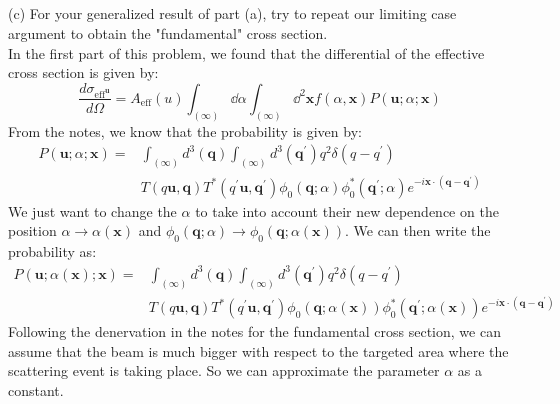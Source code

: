 \documentclass[12pt]{article}
\begin{document}
\subsection{}
(c) For your generalized result of part (a), try to repeat our limiting case argument to obtain the "fundamental" cross section.\\
In the first part of this problem, we found that the differential of the effective cross section is given by:
\begin{equation}
\frac{d\sigma_{\text{eff}^{\textbf{u}}}}{d\Omega} = A_{\text{eff}}(u) \int_{(\infty)} \dd{\alpha} \int_{(\infty)} \dd^2{\textbf{x}} f(\alpha, \textbf{x}) P(\textbf{u} ; \alpha ; \mathbf{x})
\end{equation}
From the notes, we know that the probability is given by:
\begin{equation}
\begin{aligned}
P(\mathbf{u} ; \alpha ; \mathbf{x})= & \int_{(\infty)} d^3(\mathbf{q}) \int_{(\infty)} d^3\left(\mathbf{q}^{\prime}\right) q^2 \delta\left(q-q^{\prime}\right) \\
& T(q \mathbf{u}, \mathbf{q}) T^*\left(q^{\prime} \mathbf{u}, \mathbf{q}^{\prime}\right) \phi_0(\mathbf{q} ; \alpha) \phi_0^*\left(\mathbf{q}^{\prime} ; \alpha\right) e^{-i \mathbf{x} \cdot\left(\mathbf{q}-\mathbf{q}^{\prime}\right)}
\end{aligned}
\end{equation}
We just want to change the $\alpha $ to take into account their new dependence on the position $\alpha \rightarrow \alpha(\textbf{x})$ and $\phi_0(\mathbf{q} ; \alpha) \rightarrow \phi_0(\mathbf{q} ; \alpha(\textbf{x}))$. We can then write the probability as:
\begin{equation}
\begin{aligned}
P(\mathbf{u} ; \alpha(\textbf{x}) ; \mathbf{x})= & \int_{(\infty)} d^3(\mathbf{q}) \int_{(\infty)} d^3\left(\mathbf{q}^{\prime}\right) q^2 \delta\left(q-q^{\prime}\right) \\
& T(q \mathbf{u}, \mathbf{q}) T^*\left(q^{\prime} \mathbf{u}, \mathbf{q}^{\prime}\right) \phi_0(\mathbf{q} ; \alpha(\textbf{x})) \phi_0^*\left(\mathbf{q}^{\prime} ; \alpha(\textbf{x})\right) e^{-i \mathbf{x} \cdot\left(\mathbf{q}-\mathbf{q}^{\prime}\right)}
\end{aligned}
\end{equation}
Following the denervation in the notes for the fundamental cross section, we can assume that the beam is much bigger with respect to the targeted area where the scattering event is taking place. So we can approximate the parameter $\alpha$ as a constant. 
\end{document}
